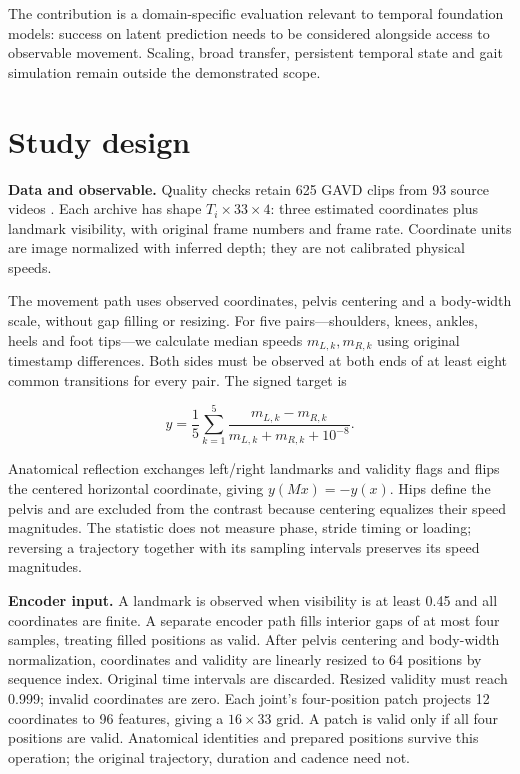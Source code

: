 \documentclass{article}
\begin{document}
The contribution is a domain-specific evaluation relevant to temporal
foundation models: success on latent prediction needs to be considered
alongside access to observable movement. Scaling, broad transfer,
persistent temporal state and gait simulation remain outside the
demonstrated scope.

\section{Study design}\label{study-design}

\textbf{Data and observable.} Quality checks retain 625 GAVD clips from
93 source videos \citep{gavd}. Each archive has shape
\(T_i\times33\times4\): three estimated coordinates plus landmark
visibility, with original frame numbers and frame rate. Coordinate units
are image normalized with inferred depth; they are not calibrated
physical speeds.

The movement path uses observed coordinates, pelvis centering and a
body-width scale, without gap filling or resizing. For five
pairs---shoulders, knees, ankles, heels and foot tips---we calculate
median speeds \(m_{L,k},m_{R,k}\) using original timestamp differences.
Both sides must be observed at both ends of at least eight common
transitions for every pair. The signed target is

\[y=\frac{1}{5}\sum_{k=1}^{5}\frac{m_{L,k}-m_{R,k}}{m_{L,k}+m_{R,k}+10^{-8}}.\]

Anatomical reflection exchanges left/right landmarks and validity flags
and flips the centered horizontal coordinate, giving \(y(Mx)=-y(x)\).
Hips define the pelvis and are excluded from the contrast because
centering equalizes their speed magnitudes. The statistic does not
measure phase, stride timing or loading; reversing a trajectory together
with its sampling intervals preserves its speed magnitudes.

\textbf{Encoder input.} A landmark is observed when visibility is at
least 0.45 and all coordinates are finite. A separate encoder path fills
interior gaps of at most four samples, treating filled positions as
valid. After pelvis centering and body-width normalization, coordinates
and validity are linearly resized to 64 positions by sequence index.
Original time intervals are discarded. Resized validity must reach
0.999; invalid coordinates are zero. Each joint's four-position patch
projects 12 coordinates to 96 features, giving a \(16\times33\) grid. A
patch is valid only if all four positions are valid. Anatomical
identities and prepared positions survive this operation; the original
trajectory, duration and cadence need not.
\end{document}
